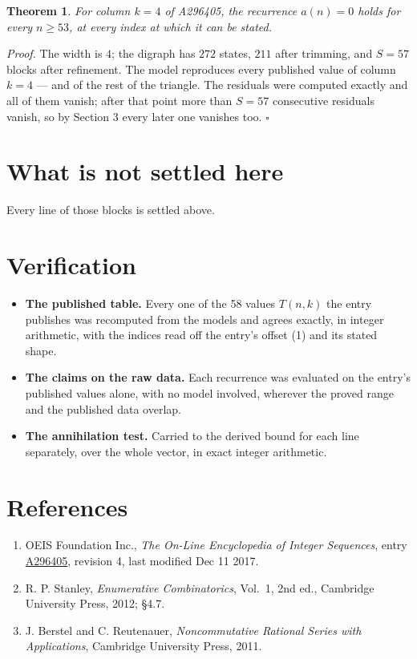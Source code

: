 \documentclass[11pt]{article}
\newtheorem{theorem}{Theorem}
\theoremstyle{definition}
\begin{document}
\begin{theorem} For column $k = 4$ of A296405, the recurrence $a(n) = 0$ holds for every $n \ge 53$, at every index at which it can be stated.\end{theorem}

{\itshape Proof.} The width is $4$; the digraph has $272$ states, $211$ after trimming, and $S = 57$ blocks after refinement. The model reproduces every published value of column $k = 4$ --- and of the rest of the triangle. The residuals were computed exactly and all of them vanish; after that point more than $S = 57$ consecutive residuals vanish, so by Section 3 every later one vanishes too. $\square$

\section{What is not settled here}

Every line of those blocks is settled above.

\section{Verification}

\begin{itemize}

\item {\bfseries The published table.} Every one of the 58 values $T(n,k)$ the entry publishes was recomputed from the models and agrees exactly, in integer arithmetic, with the indices read off the entry's offset (1) and its stated shape.

\item {\bfseries The claims on the raw data.} Each recurrence was evaluated on the entry's published values alone, with no model involved, wherever the proved range and the published data overlap.

\item {\bfseries The annihilation test.} Carried to the derived bound for each line separately, over the whole vector, in exact integer arithmetic.

\end{itemize}

\section{References}

\begin{enumerate}

\item OEIS Foundation Inc., \emph{The On-Line Encyclopedia of Integer Sequences}, entry \href{https://oeis.org/A296405}{A296405}, revision 4, last modified Dec 11 2017.

\item R. P. Stanley, \emph{Enumerative Combinatorics}, Vol.~1, 2nd ed., Cambridge University Press, 2012; \S4.7.

\item J. Berstel and C. Reutenauer, \emph{Noncommutative Rational Series with Applications}, Cambridge University Press, 2011.

\end{enumerate}
\end{document}
